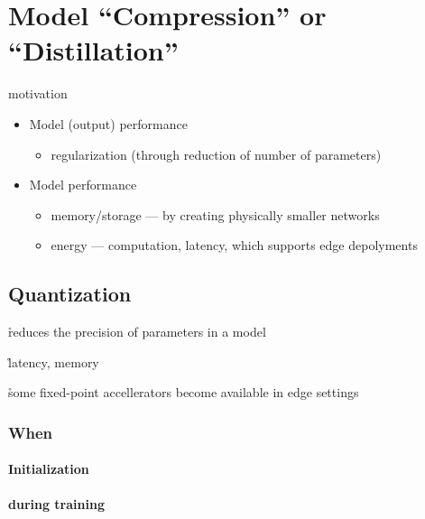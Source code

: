 \chapter{Model ``Compression'' or ``Distillation''}
motivation


\begin{itemize}[noitemsep,topsep=0pt]
	\item Model (output) performance
	\begin{itemize}[noitemsep,topsep=0pt]
		\item regularization (through reduction of number of parameters)
	\end{itemize}
	\item Model performance
	\begin{itemize}[noitemsep,topsep=0pt]
		\item memory/storage --- by creating physically smaller networks
		\item energy --- computation, latency, which supports edge depolyments
	\end{itemize}
\end{itemize}

\section{Quantization}


\r{reduces the precision of parameters in a model}

\r{latency, memory}

\r{some fixed-point accellerators become available in edge settings}

\subsection{When}

\subsubsection{Initialization}



\subsubsection{during training}

